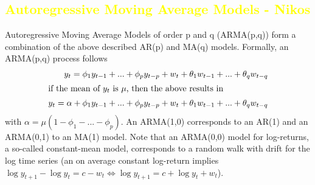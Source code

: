 \subsection{\textcolor{yellow}{Autoregressive Moving Average Models - Nikos}}
Autoregressive Moving Average Models of order p and q (ARMA(p,q)) form a combination of the above described AR(p) and MA(q) models. Formally, an ARMA(p,q) process follows
\begin{align}
    y_t = \phi_1 y_{t-1} + ... + \phi_p y_{t-p} + w_t + \theta_1 w_{t-1} + ... + \theta_q w_{t-q} \\
    \intertext{if the mean of $y_t$ is $\mu$, then the above results in}
    y_t = \alpha + \phi_1 y_{t-1} + ... + \phi_p y_{t-p} + w_t + \theta_1 w_{t-1} + ... + \theta_q w_{t-q}
\end{align}
with $\alpha = \mu (1 - \phi_1 - ... - \phi_p)$. An ARMA(1,0) corresponds to an AR(1) and an ARMA(0,1) to an MA(1) model. Note that an ARMA(0,0) model for log-returns, a so-called constant-mean model, corresponds to a random walk with drift for the log time series (an on average constant log-return implies $\log{y_{t+1}} - \log{y_t} = c - w_t \Leftrightarrow \log{y_{t+1}} = c + \log{y_t} + w_t$). 


